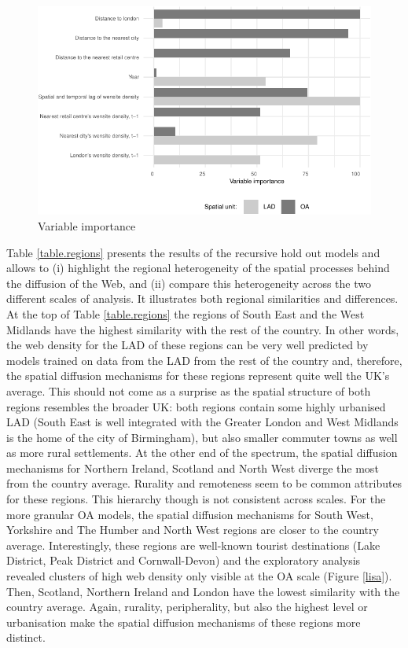 \documentclass[
  authoryear,
  preprint,
  3p]{elsarticle}
\begin{document}
\begin{figure}[H]

{\centering \includegraphics[width=1\textwidth,height=0.6\textheight]{anonymised_files/figure-pdf/varimp-1.pdf}

}

\caption{\label{var.imp}Variable importance}

\end{figure}%

Table \ref{table.regions} presents the results of the recursive hold out
models and allows to (i) highlight the regional heterogeneity of the
spatial processes behind the diffusion of the Web, and (ii) compare this
heterogeneity across the two different scales of analysis. It
illustrates both regional similarities and differences. At the top of
Table \ref{table.regions} the regions of South East and the West
Midlands have the highest similarity with the rest of the country. In
other words, the web density for the LAD of these regions can be very
well predicted by models trained on data from the LAD from the rest of
the country and, therefore, the spatial diffusion mechanisms for these
regions represent quite well the UK's average. This should not come as a
surprise as the spatial structure of both regions resembles the broader
UK: both regions contain some highly urbanised LAD (South East is well
integrated with the Greater London and West Midlands is the home of the
city of Birmingham), but also smaller commuter towns as well as more
rural settlements. At the other end of the spectrum, the spatial
diffusion mechanisms for Northern Ireland, Scotland and North West
diverge the most from the country average. Rurality and remoteness seem
to be common attributes for these regions. This hierarchy though is not
consistent across scales. For the more granular OA models, the spatial
diffusion mechanisms for South West, Yorkshire and The Humber and North
West regions are closer to the country average. Interestingly, these
regions are well-known tourist destinations (Lake District, Peak
District and Cornwall-Devon) and the exploratory analysis revealed
clusters of high web density only visible at the OA scale (Figure
\ref{lisa}). Then, Scotland, Northern Ireland and London have the lowest
similarity with the country average. Again, rurality, peripherality, but
also the highest level or urbanisation make the spatial diffusion
mechanisms of these regions more distinct.
\end{document}
